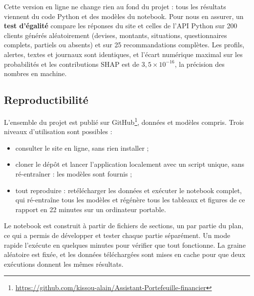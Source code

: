 Cette version en ligne ne change rien au fond du projet : tous les résultats viennent du code Python et des modèles du notebook. Pour nous en assurer, un \textbf{test d'égalité} compare les réponses du site et celles de l'API Python sur 200 clients générés aléatoirement (devises, montants, situations, questionnaires complets, partiels ou absents) et sur 25 recommandations complètes. Les profils, alertes, textes et journaux sont identiques, et l'écart numérique maximal sur les probabilités et les contributions SHAP est de $3{,}5 \times 10^{-16}$, la précision des nombres en machine.

\subsection{Reproductibilité}

L'ensemble du projet est publié sur GitHub\footnote{\url{https://github.com/kissou-alain/Assistant-Portefeuille-financier}}, données et modèles compris. Trois niveaux d'utilisation sont possibles :
\begin{itemize}
  \item consulter le site en ligne, sans rien installer ;
  \item cloner le dépôt et lancer l'application localement avec un script unique, sans ré-entraîner : les modèles sont fournis ;
  \item tout reproduire : retélécharger les données et exécuter le notebook complet, qui ré-entraîne tous les modèles et régénère tous les tableaux et figures de ce rapport en 22 minutes sur un ordinateur portable.
\end{itemize}
Le notebook est construit à partir de fichiers de sections, un par partie du plan, ce qui a permis de développer et tester chaque partie séparément. Un mode rapide l'exécute en quelques minutes pour vérifier que tout fonctionne. La graine aléatoire est fixée, et les données téléchargées sont mises en cache pour que deux exécutions donnent les mêmes résultats.
